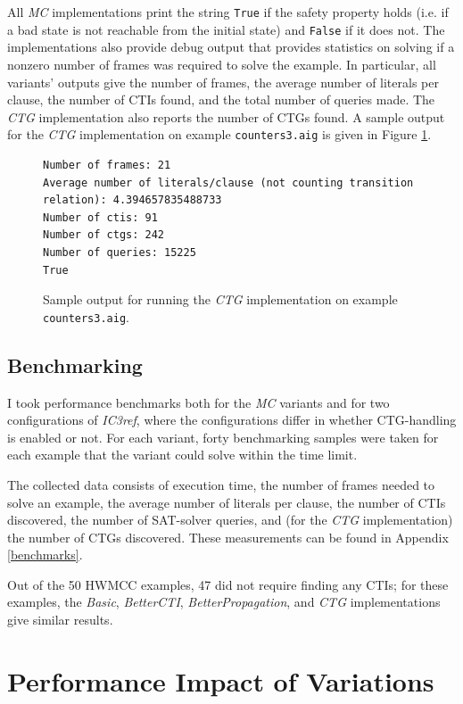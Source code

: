 \documentclass[12pt,a4paper,twoside,openright]{report}
\begin{document}
{{All \emph{MC} implementations print the string \verb,True, if the safety
property holds (i.e. if a bad state is not reachable from the initial state) and
\verb,False, if it does not. The implementations also provide debug output that provides
statistics on solving if a nonzero number of frames was required to solve the example.
In particular, all variants' outputs give the number of frames, the average number of
literals per clause, the number of CTIs found, and the total number of queries made. The {\it CTG} implementation also reports the number of CTGs found. A sample output
for the {\it CTG} implementation on example \verb,counters3.aig,
is given in Figure \ref{sampleoutput}.

\begin{figure}[t]
\centering
\begin{lstlisting}[keywordstyle = \ttfamily, basicstyle = \footnotesize\ttfamily]
Number of frames: 21
Average number of literals/clause (not counting transition relation): 4.394657835488733
Number of ctis: 91
Number of ctgs: 242
Number of queries: 15225
True
\end{lstlisting}
\caption{Sample output for running the \emph{CTG} implementation on example {\tt counters3.aig}.}
\label{sampleoutput}
\end{figure}

\subsection{Benchmarking}
\label{eval:benchmarking}
I took performance benchmarks both for the \emph{MC} variants and for two configurations
of \emph{IC3ref}, where the configurations differ in whether CTG-handling is enabled
or not. For each variant, forty benchmarking samples were taken for each example that
the variant could solve within the time limit.

The collected data consists of execution time,
the number of frames needed to solve an example,
the average number of literals per clause, the number of CTIs discovered, the number of SAT-solver queries,
and (for the \emph{CTG} implementation) the number of CTGs discovered. These measurements can be found in
Appendix \ref{benchmarks}.

Out of the 50 HWMCC examples, 47 did not require finding any
CTIs; for these examples, the \emph{Basic}, \emph{BetterCTI}, \emph{BetterPropagation},
and \emph{CTG} implementations give similar results. 

\section{Performance Impact of Variations}
\label{eval:variants}

}}
\end{document}
